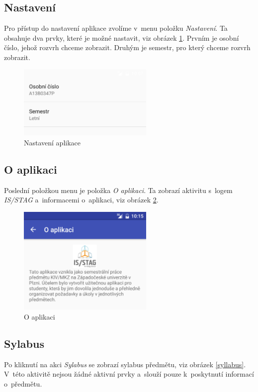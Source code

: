 \documentclass[12pt, a4paper]{article}
\begin{document}
		\subsection{Nastavení}
		Pro přístup do nastavení aplikace zvolíme v~menu položku \emph{Nastavení}. Ta obsahuje dva prvky, které je možné nastavit, viz obrázek \ref{settings}. Prvním je osobní číslo, jehož rozvrh chceme zobrazit. Druhým je semestr, pro který chceme rozvrh zobrazit. 
		
		\begin{figure}[ht!]
			\centering
			\caption{Nastavení aplikace}
			\label{settings}
			\includegraphics[width=6.5cm]{img/settings.png}
		\end{figure}
		\FloatBarrier
		
		\subsection{O aplikaci}
		Poslední položkou menu je položka \emph{O aplikaci}. Ta zobrazí aktivitu s~logem \emph{IS/STAG} a~informacemi o~aplikaci, viz obrázek \ref{about}.
		
		\begin{figure}[ht!]
			\centering
			\caption{O aplikaci}
			\label{about}
			\includegraphics[width=6.5cm]{img/about.png}
		\end{figure}
		\FloatBarrier
		
		\subsection{Sylabus}
		Po kliknutí na akci \emph{Sylabus} se zobrazí sylabus předmětu, viz obrázek \ref{syllabus}. V~této aktivitě nejsou žádné aktivní prvky a~slouží pouze k~poskytnutí informací o~předmětu.
		
\end{document}
